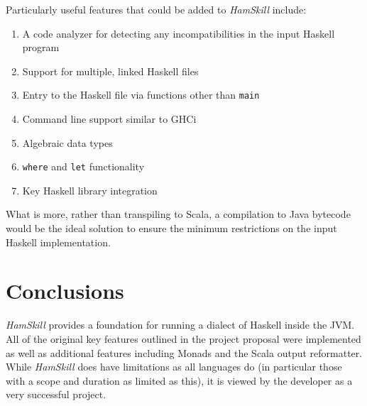 \documentclass{report}
\begin{document}
Particularly useful features that could be added to \textit{HamSkill} include:

\begin{enumerate}

\item A code analyzer for detecting any incompatibilities in the input Haskell program

\item Support for multiple, linked Haskell files

\item Entry to the Haskell file via functions other than \texttt{main}

\item Command line support similar to GHCi

\item Algebraic data types

\item \texttt{where} and \texttt{let} functionality

\item Key Haskell library integration

\end{enumerate}

What is more, rather than transpiling to Scala, a compilation to Java bytecode would be the ideal solution to ensure the minimum restrictions on the input Haskell implementation.

\section{Conclusions}

\textit{HamSkill} provides a foundation for running a dialect of Haskell inside the JVM.  All of the original key features outlined in the project proposal were implemented as well as additional features including Monads and the Scala output reformatter.  While \textit{HamSkill} does have limitations as all languages do (in particular those with a scope and duration as limited as this), it is viewed by the developer as a very successful project.

\pagebreak


\end{document}

